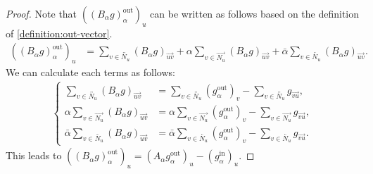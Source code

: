 \documentclass[10pt,a4paper]{amsart}
\begin{document}
\begin{proof}
	Note that $( \left( B_{\alpha} g \right)_{\alpha}^{\text{out}} )_{u}$ can be written as follows based on the definition of \eqref{definition:out-vector}.
	\begin{align*}
		\left( \left( B_{\alpha} g \right)_{\alpha}^{\text{out}} \right)_{u} & =
		\sum_{v \in \overleftrightarrow{N_u}} \left( B_{\alpha} g \right)_{\overrightarrow{uv}}
		+ \alpha \sum_{v \in \overrightarrow{N_u}} \left( B_{\alpha} g \right)_{\overrightarrow{uv}}
		+ \bar{\alpha} \sum_{v \in \overleftarrow{N_u}} \left( B_{\alpha} g \right)_{\overrightarrow{uv}}
		.
	\end{align*}
	We can calculate each terms as follows:
	\begin{align*} \left\{\begin{aligned}
			       \sum_{v \in \overleftrightarrow{N_u}} \left( B_{\alpha} g \right)_{\overrightarrow{uv}}
			        & =  \sum_{v \in \overleftrightarrow{N_u}} \left( g_{\alpha}^{\text{out}} \right)_{v}
			       - \sum_{v \in \overleftrightarrow{N_u}} g_{\overrightarrow{vu}}
			       ,                                                                                              \\
			       \alpha \sum_{v \in \overrightarrow{N_u}} \left( B_{\alpha} g \right)_{\overrightarrow{uv}}
			        & =  \alpha \sum_{v \in \overrightarrow{N_u}} \left( g_{\alpha}^{\text{out}} \right)_{v}
			       - \sum_{v \in \overrightarrow{N_u}} g_{\overrightarrow{vu}}
			       ,                                                                                              \\
			       \bar{\alpha} \sum_{v \in \overleftarrow{N_u}} \left( B_{\alpha} g \right)_{\overrightarrow{uv}}
			        & =  \bar{\alpha} \sum_{v \in \overleftarrow{N_u}} \left( g_{\alpha}^{\text{out}} \right)_{v}
			       - \sum_{v \in \overleftarrow{N_u}} g_{\overrightarrow{vu}}
			       .
		       \end{aligned}\right.
	\end{align*}
	This leads to $( \left( B_{\alpha} g \right)_{\alpha}^{\text{out}} )_{u} = ( A_{\alpha} g_{\alpha}^{\text{out}} )_{u} - ( g_{\alpha}^{\text{in}} )_{u}$.


\end{proof}
\end{document}
